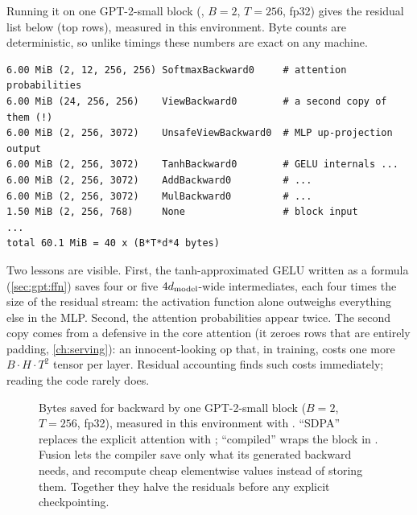 Running it on one GPT-2-small block (, $B=2$, $T=256$, fp32) gives the
residual list below (top rows), measured in this environment. Byte counts are deterministic, so
unlike timings these numbers are exact on any machine.

\begin{lstlisting}[style=plain]
6.00 MiB (2, 12, 256, 256) SoftmaxBackward0     # attention probabilities
6.00 MiB (24, 256, 256)    ViewBackward0        # a second copy of them (!)
6.00 MiB (2, 256, 3072)    UnsafeViewBackward0  # MLP up-projection output
6.00 MiB (2, 256, 3072)    TanhBackward0        # GELU internals ...
6.00 MiB (2, 256, 3072)    AddBackward0         # ...
6.00 MiB (2, 256, 3072)    MulBackward0         # ...
1.50 MiB (2, 256, 768)     None                 # block input
...
total 60.1 MiB = 40 x (B*T*d*4 bytes)
\end{lstlisting}

Two lessons are visible. First, the tanh-approximated GELU written as a formula
(\cref{sec:gpt:ffn}) saves four or five $4d_{\text{model}}$-wide intermediates, each four times the size of the
residual stream: the activation function alone outweighs everything else in the MLP. Second, the
attention probabilities appear twice. The second copy comes from a defensive
 in the core attention (it zeroes rows that are entirely padding,
\cref{ch:serving}): an innocent-looking op that, in training, costs one more $B\cdot H\cdot T^2$
tensor per layer. Residual accounting finds such costs immediately; reading the code rarely does.

\begin{figure}[t]
\centering
{}
\caption{Bytes saved for backward by one GPT-2-small block ($B=2$, $T=256$, fp32), measured in
this environment with . ``SDPA'' replaces the explicit attention with
; ``compiled'' wraps the block in .
Fusion lets the compiler save only what its generated backward needs, and recompute cheap
elementwise values instead of storing them. Together they halve the residuals before any
explicit checkpointing.}
\label{fig:perf:residuals}
\end{figure}

